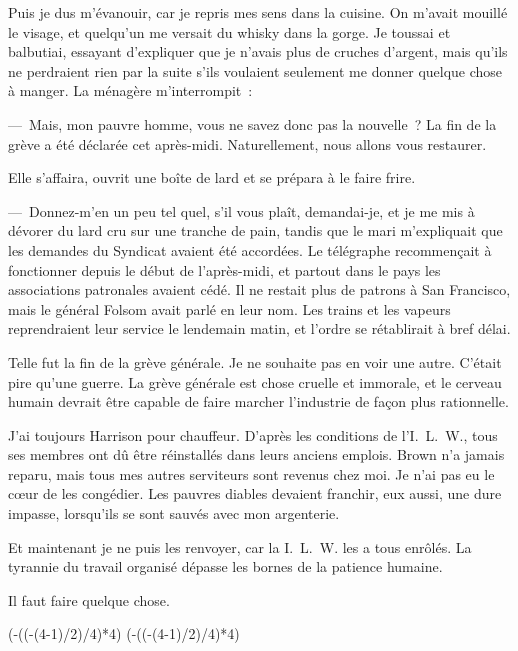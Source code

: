 \documentclass[french,twoside]{book} %
\def\truncdiv#1#2{((#1-(#2-1)/2)/#2)}
\def\moduloop#1#2{(#1-\truncdiv{#1}{#2}*#2)}
\def\modulo#1#2{\number\numexpr\moduloop{#1}{#2}\relax}
\begin{document}
Puis je dus m’évanouir, car je repris mes sens dans la cuisine. On m’avait mouillé le visage, et quelqu’un me versait du whisky dans la gorge. Je toussai et balbutiai, essayant d’expliquer que je n’avais plus de cruches d’argent, mais qu’ils ne perdraient rien par la suite s’ils voulaient seulement me donner quelque chose à manger. La ménagère m’interrompit :\par
— Mais, mon pauvre homme, vous ne savez donc pas la nouvelle ? La fin de la grève a été déclarée cet après-midi. Naturellement, nous allons vous restaurer.\par
Elle s’affaira, ouvrit une boîte de lard et se prépara à le faire frire.\par
— Donnez-m’en un peu tel quel, s’il vous plaît, demandai-je, et je me mis à dévorer du lard cru sur une tranche de pain, tandis que le mari m’expliquait que les demandes du Syndicat avaient été accordées. Le télégraphe recommençait à fonctionner depuis le début de l’après-midi, et partout dans le pays les associations patronales avaient cédé. Il ne restait plus de patrons à San Francisco, mais le général Folsom avait parlé en leur nom. Les trains et les vapeurs reprendraient leur service le lendemain matin, et l’ordre se rétablirait à bref délai.\par
Telle fut la fin de la grève générale. Je ne souhaite pas en voir une autre. C’était pire qu’une guerre. La grève générale est chose cruelle et immorale, et le cerveau humain devrait être capable de faire marcher l’industrie de façon plus rationnelle.\par
J’ai toujours Harrison pour chauffeur. D’après les conditions de l’I. L. W., tous ses membres ont dû être réinstallés dans leurs anciens emplois. Brown n’a jamais reparu, mais tous mes autres serviteurs sont revenus chez moi. Je n’ai pas eu le cœur de les congédier. Les pauvres diables devaient franchir, eux aussi, une dure impasse, lorsqu’ils se sont sauvés avec mon argenterie.\par
Et maintenant je ne puis les renvoyer, car la I. L. W. les a tous enrôlés. La tyrannie du travail organisé dépasse les bornes de la patience humaine.\par
Il faut faire quelque chose.
 


\ifbooklet
  \pagestyle{empty}
  \clearpage
  \ifnum\modulo{\value{page}}{4}=0 \hbox{}\newpage\hbox{}\newpage\fi
  \ifnum\modulo{\value{page}}{4}=1 \hbox{}\newpage\hbox{}\newpage\fi
\end{document}
